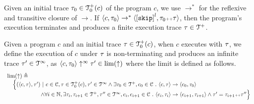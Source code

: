 Given an initial trace $\mathtt{\tau}_0 \in \mathcal{T}^{+}_0(c)$ of the program $c$,
we use $\to^*$ for the reflexive and transitive closure of $\to$. 
If $\config{c, \trace_0} \rightarrow^{*} \config{\clabel{\eskip}^l, \trace_0 \tracecat \trace}$,
then the program's execution terminates and produces a finite execution trace $\mathtt{\tau} \in \mathcal{T}^{+}$.
\\
\begin{defn}
  \label{def:non-terminating}
  Given a program $c$ and an initial trace $\mathtt{\tau} \in \mathcal{T}^{+}_0(c)$,
  when $c$ executes with $\mathtt{\tau}$,  we define the execution of $c$ under $\mathtt{\tau}$ is non-terminating and produces an infinite trace $\mathtt{\tau}' \in \mathcal{T}^{\infty}$, as 
  $\langle c, \mathtt{\tau}_0 \rangle \uparrow^{\infty} \mathtt{\tau}' \in \lim(\uparrow)$
  where the limit is defined as follows.
  \[
    \begin{array}{l}
      \lim(\uparrow) 
      \triangleq 
    \\ \quad
    \Big\{
      (\langle c, \mathtt{\tau} \rangle, \mathtt{\tau}') ~\vert~ 
      c\in \mathcal{C}, \mathtt{\tau} \in \mathcal{T}^{+}_0(c),
      \mathtt{\tau}' \in \mathcal{T}^{\infty} 
      \land \exists \mathtt{\tau}_0 \in \mathcal{T}^{+}, c_0 \in \mathcal{C} ~.~ 
      \langle c, \mathtt{\tau} \rangle \to \langle c_0, \mathtt{\tau}_0 \rangle
      \\ \qquad \qquad \qquad 
      \land \forall i \in \mathbb{N}, \exists \mathtt{\tau}_i, \mathtt{\tau}_{i + 1} \in \mathcal{T}^{+}, \mathtt{\tau}'' \in \mathcal{T}^{\infty}, c_i, c_{i + 1} \in \mathcal{C} ~.~ 
      \langle c_i, \mathtt{\tau}_i \rangle \to \langle c_{i + 1}, \mathtt{\tau}_{i + 1} \rangle 
      \land  \mathtt{\tau}' = \mathtt{\tau}_{i + 1} {\scriptscriptstyle ++} \mathtt{\tau}''
    \Big\}
    \end{array}
  \]
\end{defn}
%
